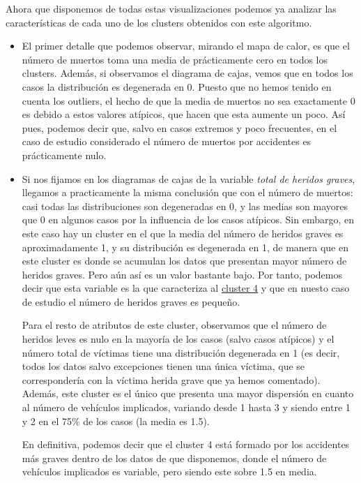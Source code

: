 \documentclass[a4paper,11pt]{book}
\begin{document}
Ahora que disponemos de todas estas visualizaciones podemos ya analizar las características de cada uno de los clusters obtenidos con este algoritmo. 

\begin{itemize}
	\item El primer detalle que podemos observar, mirando el mapa de calor, es que el número de muertos toma una media de prácticamente cero en todos los clusters. Además, si observamos el diagrama de cajas, vemos que en todos los casos la distribución es degenerada en 0. Puesto que no hemos tenido en cuenta los outliers, el hecho de que la media de muertos no sea exactamente 0 es debido a estos valores atípicos, que hacen que esta aumente un poco. Así pues, podemos decir que, salvo en casos extremos y poco frecuentes, en el caso de estudio considerado el número de muertos por accidentes es prácticamente nulo. 
	\item Si nos fijamos en los diagramas de cajas de la variable \textit{total de heridos graves}, llegamos a practicamente la misma conclusión que con el número de muertos: casi todas las distribuciones son degeneradas en 0, y las medias son mayores que 0 en algunos casos por la influencia de los casos atípicos. Sin embargo, en este caso hay un cluster en el que la media del número de heridos graves es aproximadamente 1, y su distribución es degenerada en 1, de manera que en este cluster es donde se acumulan los datos que presentan mayor número de heridos graves. Pero aún así es un valor bastante bajo. Por tanto, podemos decir que esta variable es la que caracteriza al \underline{cluster 4} y que en nuesto caso de estudio el número de heridos graves es pequeño. 
	
	Para el resto de atributos de este cluster, observamos que el número de heridos leves es nulo en la mayoría de los casos (salvo casos atípicos) y el número total de víctimas tiene una distribución degenerada en 1 (es decir, todos los datos salvo excepciones tienen una única víctima, que se correspondería con la víctima herida grave que ya hemos comentado). Además, este cluster es el único que presenta una mayor dispersión en cuanto al número de vehículos implicados, variando desde 1 hasta 3 y siendo entre 1 y 2 en el 75\% de los casos (la media es 1.5).
	
	En definitiva, podemos decir que el cluster 4 está formado por los accidentes más graves dentro de los datos de que disponemos, donde el número de vehículos implicados es variable, pero siendo este sobre 1.5 en media.


\end{itemize}
\end{document}
